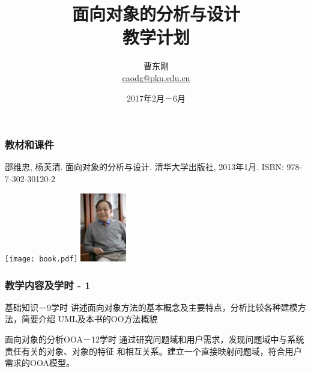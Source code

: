 \documentclass[compress]{beamer}
\begin{document}

					
\title{面向对象的分析与设计\\ 教学计划}

\author[面向对象的分析与设计]
{曹东刚\\\href{mailto:caodg@pku.edu.cn}{caodg@pku.edu.cn}}


\date{2017年2月－6月}


\begin{frame}
	\titlepage
\end{frame}

\setcounter{framenumber}{0}

\begin{frame}
  \frametitle{教材和课件}
\begin{thebibliography}{}
   邵维忠, 杨芙清. 面向对象的分析与设计. 清华大学出版社, 2013年1月. ISBN: 978-7-302-30120-2
\end{thebibliography}

\begin{center}
  \centering\texttt{[image: book.pdf]}\hspace{1cm}%
\includegraphics[height=3cm]{shao.jpg}%
\end{center}
\end{frame}


\begin{frame}
\frametitle{教学内容及学时 - 1}
\begin{block}{基础知识－9学时}
  讲述面向对象方法的基本概念及主要特点，分析比较各种建模方法，简要介绍
  UML及本书的OO方法概貌
\end{block}
\begin{block}{面向对象的分析OOA－12学时}
  通过研究问题域和用户需求，发现问题域中与系统责任有关的对象、对象的特征
  和相互关系。建立一个直接映射问题域，符合用户需求的OOA模型。
\end{block}
\end{frame}
\end{document}
